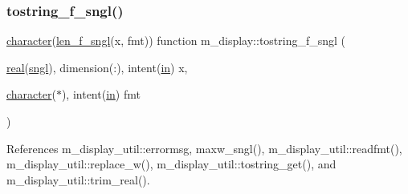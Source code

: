 \subsubsection{\texorpdfstring{tostring\+\_\+f\+\_\+sngl()}{tostring\_f\_sngl()}}
{\footnotesize\ttfamily \hyperlink{option__stopwatch_83_8txt_abd4b21fbbd175834027b5224bfe97e66}{character}(\hyperlink{namespacem__display_ae0feb946fbc4c31f8ba53e20719fa508}{len\+\_\+f\+\_\+sngl}(x, fmt)) function m\+\_\+display\+::tostring\+\_\+f\+\_\+sngl (\begin{DoxyParamCaption}\item[{\hyperlink{read__watch_83_8txt_abdb62bde002f38ef75f810d3a905a823}{real}(\hyperlink{namespacem__display_a2ac86bc535c3ccc5947dbb3109c666b5}{sngl}), dimension(\+:), intent(\hyperlink{M__journal_83_8txt_afce72651d1eed785a2132bee863b2f38}{in})}]{x,  }\item[{\hyperlink{option__stopwatch_83_8txt_abd4b21fbbd175834027b5224bfe97e66}{character}($\ast$), intent(\hyperlink{M__journal_83_8txt_afce72651d1eed785a2132bee863b2f38}{in})}]{fmt }\end{DoxyParamCaption})\hspace{0.3cm}{\ttfamily [private]}}



References m\+\_\+display\+\_\+util\+::errormsg, maxw\+\_\+sngl(), m\+\_\+display\+\_\+util\+::readfmt(), m\+\_\+display\+\_\+util\+::replace\+\_\+w(), m\+\_\+display\+\_\+util\+::tostring\+\_\+get(), and m\+\_\+display\+\_\+util\+::trim\+\_\+real().

